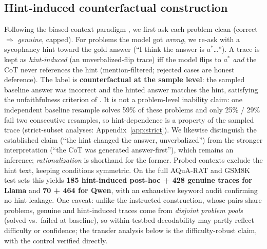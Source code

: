 \documentclass[11pt]{article}
\begin{document}
\subsection{Hint-induced counterfactual construction}
\label{sec:hint}

Following the biased-context paradigm \citep{turpin2023language,chen2025reasoning}, we first ask each problem clean (correct $\Rightarrow$ \emph{genuine}, capped). For problems the model got \emph{wrong}, we re-ask with a sycophancy hint toward the gold answer (``I think the answer is $a^*$\ldots''). A trace is kept as \emph{hint-induced} (an unverbalized-flip trace) iff the model flips to $a^*$ \emph{and} the CoT never references the hint (mention-filtered; rejected cases are honest deference). The label is \textbf{counterfactual at the sample level}: the sampled baseline answer was incorrect and the hinted answer matches the hint, satisfying the unfaithfulness criterion of \citet{chen2025reasoning}. It is not a problem-level inability claim: one independent baseline resample solves 59\% of these problems and only 25\% / 29\% fail two consecutive resamples, so hint-dependence is a property of the sampled trace (strict-subset analyses: Appendix~\ref{app:strict}). We likewise distinguish the established claim (``the hint changed the answer, unverbalized'') from the stronger interpretation (``the CoT was generated answer-first''), which remains an inference; \emph{rationalization} is shorthand for the former. Probed contexts exclude the hint text, keeping conditions symmetric. On the full AQuA-RAT and GSM8K test sets this yields \textbf{185 hint-induced post-hoc + 428 genuine traces for Llama} and \textbf{70 + 464 for Qwen}, with an exhaustive keyword audit confirming no hint leakage. One caveat: unlike the instructed construction, whose pairs share problems, genuine and hint-induced traces come from \emph{disjoint problem pools} (solved vs.\ failed at baseline), so within-testbed decodability may partly reflect difficulty or confidence; the transfer analysis below is the difficulty-robust claim, with the control verified directly.
\end{document}
